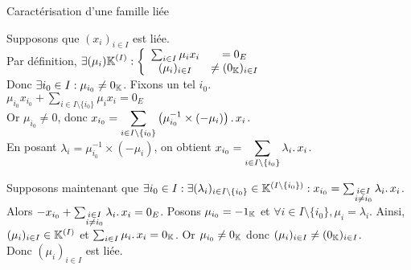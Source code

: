 \documentclass{article}
\renewenvironment{question_kholle}[2][ ]
{
	\subsection{\texorpdfstring{#2}{}}
	\notblank{#1}
	{
		\noindent #1
		\bigbreak
	}
	{}
	\begin{proof}
}
{
	\end{proof}
}
\begin{document}
	\begin{question_kholle}
		[Une famille est liée si et seulement si l'un de ses vecteurs est une combinaison linéaires d'autres vecteurs de la famille.
		\begin{equation}
			(x_i)_{i \in I} \text{ est liée}
			\iff \exists i_0 \in I : \exists (\lambda_i)_{i \in I\setminus\{i_0\}} \in \K^{\left( I \setminus \{i_0\} \right)} :
			x_{i_0} = \sum_{\substack{i \in I \\ i \neq i_0}} \lambda_i \ldotp x_i
		\end{equation}]
		{Caractérisation d'une famille liée}

		Supposons que $(x_i)_{i \in I}$ est liée. \\
		Par définition, $\displaystyle \exists (\mu_i) \mathbb K^{(I)} :
		\left\{ \begin{array}{ccc}
			\sum_{i \in I} \mu_i x_i &= 0_E \\
			(\mu_i)_{i \in I} &\neq (0_{\mathbb K})_{i \in I}
		\end{array} \right.$ \\
		Donc $\exists i_0 \in I : \mu_{i_0} \neq 0_{\mathbb K}$. Fixons un tel $i_0$. \\
		$\displaystyle \mu_{i_0} x_{i_0} + \sum_{i \in I \setminus \{i_0\}} \mu_i x_i = 0_E$ \\
		Or $\mu_{i_0} \neq 0$, donc $\displaystyle x_{i_0} = \sum_{i \in I \setminus \{i_0\}} \left( \mu_{i_0}^{-1} \times (-\mu_i) \right) \ldotp x_i$. \\
		En posant $\lambda_i = \mu_{i_0}^{-1} \times (-\mu_i)$, on obtient $x_{i_0} = \displaystyle \sum_{i \in I \setminus \{i_0\}} \lambda_i \ldotp x_i$.

		Supposons maintenant que $\exists i_0 \in I : \exists (\lambda_i)_{i \in I\setminus\{i_0\}} \in \mathbb K^{\left( I \setminus \{i_0\} \right)} :
		x_{i_0} = \sum_{\substack{i \in I \\ i \neq i_0}} \lambda_i \ldotp x_i$. \\
		Alors $-x_{i_0} + \sum_{\substack{i \in I \\ i \neq i_0}} \lambda_i \ldotp x_i = 0_E$.
		Posons $\mu_{i_0} = - 1_{\mathbb K}$ et $\forall i \in I \!\setminus\! \{i_0\}, \mu_i = \lambda_i$.
		Ainsi, $(\mu_i)_{i \in I} \in \mathbb K^{(I)}$ et $\sum_{i \in I} \mu_i \ldotp x_i = 0_{\mathbb K}$. Or $\mu_{i_0} \neq 0_{\mathbb K}$ donc $(\mu_i)_{i \in I} \neq (0_{\mathbb K})_{i \in I}$. \\
		Donc $(\mu_i)_{i \in I}$ est liée.
	\end{question_kholle}
\end{document}
